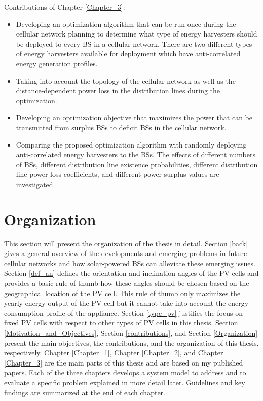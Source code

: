 Contributions of Chapter \ref{Chapter_3}:


\begin{itemize}
\item  Developing an optimization algorithm that can be run once during the cellular network planning to determine what type of energy harvesters should be deployed to every BS in a cellular network. There are two different types of energy harvesters available for deployment which have anti-correlated energy generation profiles.
\item Taking into account the topology of the cellular network as well as the distance-dependent power loss in the distribution lines during the optimization.
\item Developing an optimization objective that maximizes the power that can be transmitted from surplus BSs to deficit BSs in the cellular network.
\item Comparing the proposed optimization algorithm with randomly deploying anti-correlated energy harvesters to the BSs. The effects of different numbers of BSs, different distribution line existence probabilities, different distribution line power loss coefficients, and different power surplus values are investigated. 
\end{itemize}





\clearpage
\section{Organization\label{Organization}}
This section will present the organization of the thesis in detail. Section \ref{back} gives a general overview of the developments and emerging problems in future cellular networks and how solar-powered BSs can alleviate these emerging issues. Section \ref{def_an} defines the orientation and inclination angles of the PV cells and provides a basic rule of thumb how these angles should be chosen based on the geographical location of the PV cell. This rule of thumb only maximizes the yearly energy output of the PV cell but it cannot take into account the energy consumption profile of the appliance. Section \ref{type_pv} justifies the focus on fixed PV cells with respect to other types of PV cells in this thesis. Section \ref{Motivation_and_Objectives}, Section \ref{contributions}, and Section \ref{Organization} present the main objectives, the contributions, and the organization of this thesis, respectively. Chapter \ref{Chapter_1}, Chapter \ref{Chapter_2}, and Chapter \ref{Chapter_3} are the main parts of this thesis and are based on my published papers. Each of the three chapters develops a system model to address and to evaluate a specific problem explained in more detail later. Guidelines and key findings are summarized at the end of each chapter.

